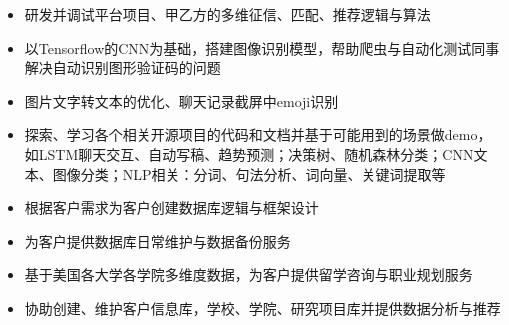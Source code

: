 \documentclass[9pt,a4paper]{altacv}
\begin{document}
\begin{itemize}
\item 研发并调试平台项目、甲乙方的多维征信、匹配、推荐逻辑与算法

\item 以Tensorflow的CNN为基础，搭建图像识别模型，帮助爬虫与自动化测试同事解决自动识别图形验证码的问题

\item 图片文字转文本的优化、聊天记录截屏中emoji识别

\item 探索、学习各个相关开源项目的代码和文档并基于可能用到的场景做demo，如LSTM聊天交互、自动写稿、趋势预测；决策树、随机森林分类；CNN文本、图像分类；NLP相关：分词、句法分析、词向量、关键词提取等
\end{itemize}

\divider

\begin{itemize}
\item 根据客户需求为客户创建数据库逻辑与框架设计
\item 为客户提供数据库日常维护与数据备份服务
\end{itemize}

\divider

\begin{itemize}
\item 基于美国各大学各学院多维度数据，为客户提供留学咨询与职业规划服务
\item 协助创建、维护客户信息库，学校、学院、研究项目库并提供数据分析与推荐
\end{itemize}

%
%


\end{document}
